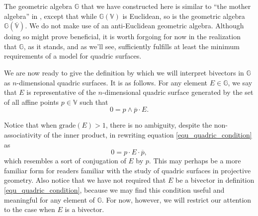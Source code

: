 \documentclass{birkjour}
\theoremstyle{definition}
\theoremstyle{remark}
\numberwithin{equation}{section}
\newcommand{\G}{\mathbb{G}}
\newcommand{\V}{\mathbb{V}}
\begin{document}
The geometric algebra $\G$ that we have constructed here is similar to ``the mother algebra''
in \cite{DoranHestenes93}, except that while $\G(\V)$
is Euclidean, so is the geometric algebra $\G(\overline{\V})$.  We do not
make use of an anti-Euclidean geometric algebra.  Although doing so might prove beneficial,
it is worth forgoing for now in the realization that $\G$, as it stands, and as we'll see, sufficiently
fulfills at least the minimum requirements of a model for quadric surfaces.

We are now ready to give the definition by which we will interpret bivectors in $\G$
as $n$-dimensional quadric surfaces.  It is as follows.
For any element $E\in\G$, we say that $E$ is representative of the $n$-dimensional
quadric surface generated by the set of all affine points $p\in\V$ such that
\begin{equation}\label{equ_quadric_condition}
0 = p\wedge\overline{p}\cdot E.
\end{equation}

Notice that when $\mbox{grade}(E)>1$, there is no ambiguity, despite the non-associativity
of the inner product, in rewriting equation
\eqref{equ_quadric_condition} as
\begin{equation}
0 = p\cdot E\cdot\overline{p},
\end{equation}
which resembles a sort of conjugation of $E$ by $p$.  This may perhaps be a more
familiar form for readers familiar with the study of quadric surfaces in projective geometry.
Also notice that we have not required that $E$ be a bivector in definition \eqref{equ_quadric_condition},
because we may find this condition useful and meaningful for any element of $\G$.  For now,
however, we will restrict our attention to the case when $E$ is a bivector.
\end{document}
